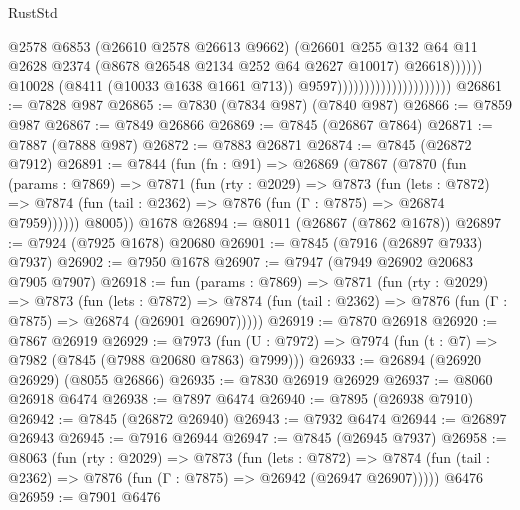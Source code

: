 \begin{lexlean}{RustStd}
\begin{coremodule}
                                                        @2578
                                                        @6853
                                                        (@26610 @2578 @26613 @9662)
                                                        (@26601
                                                          @255
                                                          @132
                                                          @64
                                                          @11
                                                          @2628
                                                          @2374
                                                          (@8678 @26548 @2134 @252 @64 @2627 @10017)
                                                          @26618))))))
                                              @10028
                                              (@8411 (@10033 @1638 @1661 @713))
                                              @9597)))))))))))))))))))))
@26861 := @7828 @987
@26865 := @7830 (@7834 @987) (@7840 @987)
@26866 := @7859 @987
@26867 := @7849 @26866
@26869 := @7845 (@26867 @7864)
@26871 := @7887 (@7888 @987)
@26872 := @7883 @26871
@26874 := @7845 (@26872 @7912)
@26891 := @7844
    (fun (fn : @91) =>
    @26869
      (@7867
        (@7870
          (fun (params : @7869) =>
          @7871
            (fun (rty : @2029) =>
            @7873
              (fun (lets : @7872) =>
              @7874 (fun (tail : @2362) => @7876 (fun (Γ : @7875) => @26874 @7959))))))
        @8005))
    @1678
@26894 := @8011 (@26867 (@7862 @1678))
@26897 := @7924 (@7925 @1678) @20680
@26901 := @7845 (@7916 (@26897 @7933) @7937)
@26902 := @7950 @1678
@26907 := @7947 (@7949 @26902 @20683 @7905 @7907)
@26918 := fun (params : @7869) =>
  @7871
    (fun (rty : @2029) =>
    @7873
      (fun (lets : @7872) =>
      @7874 (fun (tail : @2362) => @7876 (fun (Γ : @7875) => @26874 (@26901 @26907)))))
@26919 := @7870 @26918
@26920 := @7867 @26919
@26929 := @7973
    (fun (U : @7972) => @7974 (fun (t : @7) => @7982 (@7845 (@7988 @20680 @7863) @7999)))
@26933 := @26894 (@26920 @26929) (@8055 @26866)
@26935 := @7830 @26919 @26929
@26937 := @8060 @26918 @6474
@26938 := @7897 @6474
@26940 := @7895 (@26938 @7910)
@26942 := @7845 (@26872 @26940)
@26943 := @7932 @6474
@26944 := @26897 @26943
@26945 := @7916 @26944
@26947 := @7845 (@26945 @7937)
@26958 := @8063
    (fun (rty : @2029) =>
    @7873
      (fun (lets : @7872) =>
      @7874 (fun (tail : @2362) => @7876 (fun (Γ : @7875) => @26942 (@26947 @26907)))))
    @6476
@26959 := @7901 @6476

\end{coremodule}
\end{lexlean}
